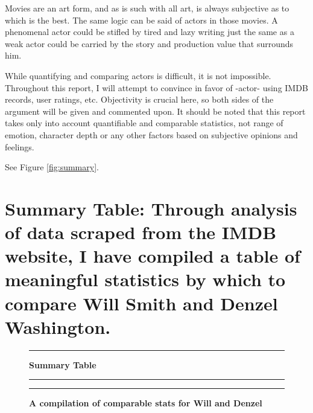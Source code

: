 \documentclass[]{article}
\begin{document}
Movies are an art form, and as is such with all art, is always
subjective as to which is the best. The same logic can be said of actors
in those movies. A phenomenal actor could be stifled by tired and lazy
writing just the same as a weak actor could be carried by the story and
production value that surrounds him.

\vspace{2.5mm}

While quantifying and comparing actors is difficult, it is not
impossible. Throughout this report, I will attempt to convince in favor
of -actor- using IMDB records, user ratings, etc. Objectivity is crucial
here, so both sides of the argument will be given and commented upon. It
should be noted that this report takes only into account quantifiable
and comparable statistics, not range of emotion, character depth or any
other factors based on subjective opinions and feelings.

\newpage

See Figure \ref{fig:summary}.

\section{Summary Table:  Through analysis of data scraped from the IMDB website, I have compiled a table of meaningful statistics by which to compare Will Smith and Denzel Washington. }
\label{sec:rq}

\begin{figure}[!ht]
    \hrule
    \caption{ \textbf{Summary Table} }
    \begin{center}
    \end{center}
    \label{fig:summary}
  \hrule
  \vspace{2.5mm}
      \caption{\textbf{ A compilation of comparable stats for Will and Denzel }   }
      \label{fig:compilation}
  \vspace{-2.5mm}
  \hrule
\end{figure}
\newpage
\end{document}

